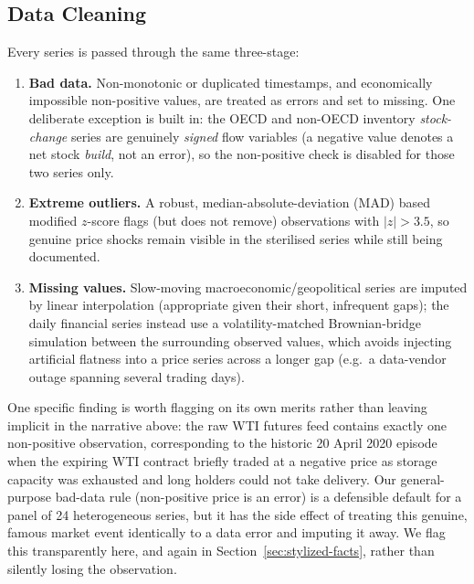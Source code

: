 \begingroup
\small
\setlength{\tabcolsep}{3pt}

\endgroup

\subsection{Data Cleaning}
\label{sec:data-cleaning}

Every series is passed through the same three-stage:

\begin{enumerate}
  \item \textbf{Bad data.} Non-monotonic or duplicated timestamps, and
    economically impossible non-positive values, are treated as errors and
    set to missing. One deliberate exception is built in: the OECD and
    non-OECD inventory \emph{stock-change} series are genuinely
    \emph{signed} flow variables (a negative value denotes a net stock
    \emph{build}, not an error), so the non-positive check is disabled for
    those two series only.
  \item \textbf{Extreme outliers.} A robust, median-absolute-deviation
    (MAD) based modified $z$-score flags (but does not remove) observations
    with $|z| > 3.5$, so genuine price shocks remain visible in the
    sterilised series while still being documented.
  \item \textbf{Missing values.} Slow-moving macroeconomic/geopolitical
    series are imputed by linear interpolation (appropriate given their
    short, infrequent gaps); the daily financial series instead use a
    volatility-matched Brownian-bridge simulation between the surrounding
    observed values, which avoids injecting artificial flatness into a price
    series across a longer gap (e.g.\ a data-vendor outage spanning several
    trading days).
\end{enumerate}

One specific finding is worth flagging on its own merits rather than leaving implicit in the narrative above: the raw WTI futures feed contains exactly one non-positive observation, corresponding to the historic 20 April 2020
episode when the expiring WTI contract briefly traded at a negative price as storage capacity was exhausted and long holders could not take delivery. Our general-purpose bad-data rule (non-positive price is an error) is
a defensible default for a panel of 24 heterogeneous series, but it has the side effect of treating this genuine, famous market event identically to a data error and imputing it away. We flag this transparently here, and again in Section~\ref{sec:stylized-facts}, rather than silently losing the observation.

